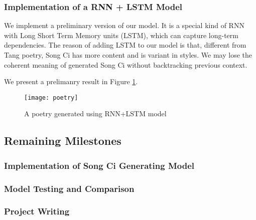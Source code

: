 \subsubsection{ Implementation of a RNN + LSTM Model  }   
We implement a preliminary version of our model. It is a special kind of RNN with Long Short Term Memory units (LSTM), which can capture long-term dependencies.
%
The reason of adding LSTM to our model is that,  different from Tang poetry, Song Ci has more content  and is variant in styles.
%
We may lose the coherent meaning of generated Song Ci without backtracking previous context.

%
We present a prelimanry result in Figure \ref{fig:poetry}. 
 
\begin{figure}[htbp]
	\centering
	\texttt{[image: poetry]}
	\caption{A poetry generated using RNN+LSTM model}
	\label{fig:poetry}	
\end{figure} 

\subsection{Remaining Milestones}
%
\subsubsection{Implementation of Song Ci Generating Model }
\subsubsection{Model Testing and Comparison}
\subsubsection{Project Writing} 
